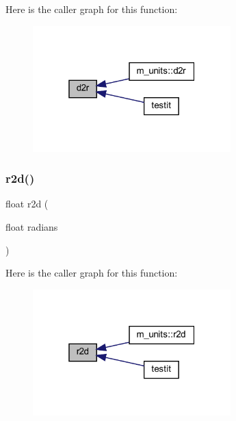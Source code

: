 Here is the caller graph for this function\+:
\nopagebreak
\begin{figure}[H]
\begin{center}
\leavevmode
\includegraphics[width=217pt]{C-M__units_8c_a4f769afe985b27d98f3114c2cb458221_icgraph}
\end{center}
\end{figure}
\mbox{\label{C-M__units_8c_ac021a3c865860684d655b69f1a1735e8}} 
\subsubsection{\texorpdfstring{r2d()}{r2d()}}
{\footnotesize\ttfamily float r2d (\begin{DoxyParamCaption}\item[{float}]{radians }\end{DoxyParamCaption})}

Here is the caller graph for this function\+:
\nopagebreak
\begin{figure}[H]
\begin{center}
\leavevmode
\includegraphics[width=217pt]{C-M__units_8c_ac021a3c865860684d655b69f1a1735e8_icgraph}
\end{center}
\end{figure}
